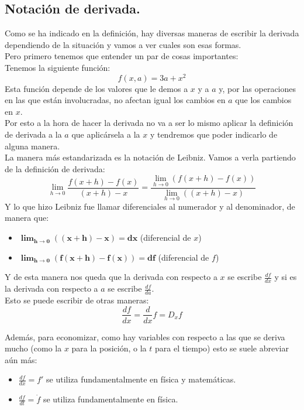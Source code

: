 \documentclass[a4paper,11pt,answers]{exam}
\newcommand\ddfrac[2]{\frac{\displaystyle #1}{\displaystyle #2}}
\begin{document}
\subsection{Notación de derivada.}
Como se ha indicado en la definición, hay diversas maneras de escribir la derivada dependiendo de la situación y vamos a ver cuales son esas formas.\\

Pero primero tenemos que entender un par de cosas importantes:\\
Tenemos la siguiente función:
\[f(x,a) = 3a + x^2\]
Esta función depende de los valores que le demos a $x$ y a $a$ y, por las operaciones en las que están involucradas, no afectan igual los cambios en $a$ que los cambios en $x$.\\
Por esto a la hora de hacer la derivada no va a ser lo mismo aplicar la definición de derivada a la $a$ que aplicársela a la $x$ y tendremos que poder indicarlo de alguna manera.\\

La manera más estandarizada es la notación de Leibniz. Vamos a verla partiendo de la definición de derivada:
\[\lim_{h \to 0} \frac{f(x+h) - f(x)}{(x+h) -x} = 
\ddfrac{\lim_{h \to 0} (f(x+h) - f(x))}{\lim_{h \to 0}((x+h) -x)}\]
Y lo que hizo Leibniz fue llamar diferenciales al numerador y al denominador, de manera que:
\begin{itemize}
	\item $\boldsymbol{ \lim_{h \to 0} ((x+h) -x) = dx}$ (diferencial de $x$)
	\item $\boldsymbol{\lim_{h \to 0} (f(x+h) - f(x)) = df}$ (diferencial de $f$)
\end{itemize}
Y de esta manera nos queda que la derivada con respecto a $x$ se escribe $\frac{df}{dx}$ y si es la derivada con respecto a $a$ se escribe $\frac{df}{da}$.\\
Esto se puede escribir de otras maneras:
\[\frac{df}{dx} = \frac{d}{dx}f = D_x f\]

Además, para economizar, como hay variables con respecto a las que se deriva mucho (como la $x$ para la posición, o la $t$ para el tiempo) esto se suele abreviar aún más:
\begin{itemize}
	\item $\frac{df}{dx} = f'$ se utiliza fundamentalmente en física y matemáticas.
	\item $\frac{df}{dt} = \dot{f}$ se utiliza fundamentalmente en física.
\end{itemize}
\end{document}
